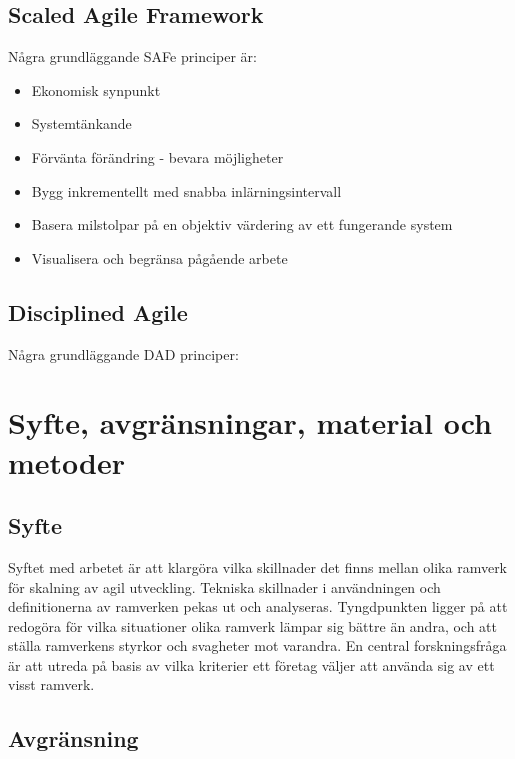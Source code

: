 	\subsection{Scaled Agile Framework}
	
		
		Några grundläggande SAFe principer är: \cite{safe_principles}
		\begin{itemize}
			\item Ekonomisk synpunkt
			\item Systemtänkande
			\item Förvänta förändring - bevara möjligheter
			\item Bygg inkrementellt med snabba inlärningsintervall
			\item Basera milstolpar på en objektiv värdering av ett fungerande system
			\item Visualisera och begränsa pågående arbete
		\end{itemize}
		
	
	\subsection{Disciplined Agile}
	
		Några grundläggande DAD principer: \cite{dad_principles}
		
	\newpage

\section{Syfte, avgränsningar, material och metoder}
	
	
	\subsection{Syfte}
	
		Syftet med arbetet är att klargöra vilka skillnader det finns mellan olika ramverk för skalning av agil utveckling. Tekniska skillnader i användningen och definitionerna av ramverken pekas ut och analyseras.
		Tyngdpunkten ligger på att redogöra för vilka situationer olika ramverk lämpar sig bättre än andra, och att ställa ramverkens styrkor och svagheter mot varandra. \newline
		En central forskningsfråga är att utreda på basis av vilka kriterier ett företag väljer att använda sig av ett visst ramverk.
		
	
	
	
	\subsection{Avgränsning}
	

